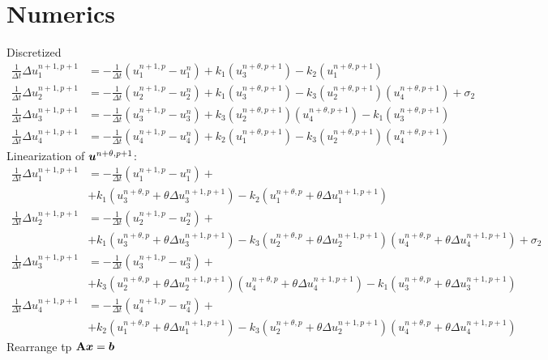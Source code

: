 \documentclass[biblatex]{deltares_memo}
\newcommand{\Dt}{\Delta t}
\renewcommand{\vec}[1]{\mbox{\boldmath $#1$} }
\newcommand{\mat}[1]{\mbox{\boldmath ${\rm #1}$} }
\begin{document}
\section{Numerics}
Discretized
\begin{align}
    \frac{1}{\Dt}\Delta u_1^{n+1, p+1} & = - \frac{1}{\Dt}(u_1^{n+1,p} - u_1^n) + k_1 (u_3^{n+\theta,p+1}) - k_2 (u_1^{n+\theta,p+1})
    \\
    \frac{1}{\Dt}\Delta u_2^{n+1, p+1} & = - \frac{1}{\Dt}(u_2^{n+1,p} - u_2^n) + k_1(u_3^{n+\theta,p+1}) - k_3 (u_2^{n+\theta,p+1}) (u_4^{n+\theta,p+1}) +\sigma_2
    \\
    \frac{1}{\Dt}\Delta u_3^{n+1, p+1} & = - \frac{1}{\Dt}(u_3^{n+1,p} - u_3^n) + k_3 (u_2^{n+\theta,p+1}) (u_4^{n+\theta,p+1}) - k_1(u_3^{n+\theta,p+1})
    \\
    \frac{1}{\Dt}\Delta u_4^{n+1, p+1} & = - \frac{1}{\Dt}(u_4^{n+1,p} - u_4^n) + k_2(u_1^{n+\theta,p+1}) - k_3 (u_2^{n+\theta,p+1}) (u_4^{n+\theta,p+1})
\end{align}
Linearization of $\vec{u}^{n+\theta,p+1}$:
\begin{align}
    \frac{1}{\Dt}\Delta u_1^{n+1, p+1} & =
    - \frac{1}{\Dt}(u_1^{n+1,p} - u_1^n) + \\
    & + k_1 (u_3^{n+\theta,p} + \theta \Delta u_3^{n+1, p+1}) - k_2 (u_1^{n+\theta,p} + \theta \Delta u_1^{n+1, p+1})
    \\
    \frac{1}{\Dt}\Delta u_2^{n+1, p+1} & = - \frac{1}{\Dt}(u_2^{n+1,p} - u_2^n) +
    \\
    & + k_1(u_3^{n+\theta,p} + \theta \Delta u_3^{n+1, p+1}) - k_3 (u_2^{n+\theta,p} + \theta \Delta u_2^{n+1, p+1}) (u_4^{n+\theta,p} + \theta \Delta u_4^{n+1, p+1}) +\sigma_2
    \\
    \frac{1}{\Dt}\Delta u_3^{n+1, p+1} & = - \frac{1}{\Dt}(u_3^{n+1,p} - u_3^n) +
    \\
    & +  k_3 (u_2^{n+\theta,p} + \theta \Delta u_2^{n+1, p+1}) (u_4^{n+\theta,p} + \theta \Delta u_4^{n+1, p+1}) - k_1(u_3^{n+\theta,p} + \theta \Delta u_3^{n+1, p+1})
    \\
    \frac{1}{\Dt}\Delta u_4^{n+1, p+1} & = - \frac{1}{\Dt}(u_4^{n+1,p} - u_4^n) +
    \\
    & + k_2(u_1^{n+\theta,p} + \theta \Delta u_1^{n+1, p+1}) - k_3 (u_2^{n+\theta,p} + \theta \Delta u_2^{n+1, p+1}) (u_4^{n+\theta,p} + \theta \Delta u_4^{n+1, p+1})
\end{align}
Rearrange tp $\mat{A}\vec{x}=\vec{b}$
\end{document}
